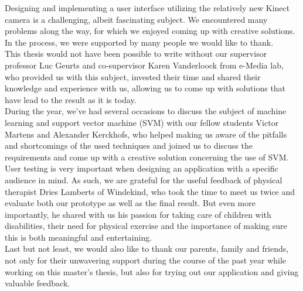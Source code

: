 Designing and implementing a user interface utilizing the relatively new Kinect camera is a challenging, albeit fascinating subject. We encountered many problems along the way, for which we enjoyed coming up with creative solutions. In the process, we were supported by many people we would like to thank.\\

This thesis would not have been possible to write without our supervisor professor Luc Geurts and co-supervisor Karen Vanderloock from e-Media lab, who provided us with this subject, invested their time and shared their knowledge and experience with us, allowing us to come up with solutions that have lead to the result as it is today.\\

During the year, we've had several occasions to discuss the subject of machine learning and support vector machine (SVM) with our fellow students Victor Martens and Alexander Kerckhofs, who helped making us aware of the pitfalls and shortcomings of the used techniques and joined us to discuss the requirements and come up with a creative solution concerning the use of SVM.\\

User testing is very important when designing an application with a specific audience in mind. As such, we are grateful for the useful feedback of physical therapist Dries Lamberts of Windekind, who took the time to meet us twice and evaluate both our prototype as well as the final result. But even more importantly, he shared with us his passion for taking care of children with disabilities, their need for physical exercise and the importance of making sure this is both meaningful and entertaining.\\

Last but not least, we would also like to thank our parents, family and friends, not only for their unwavering support during the course of the past year while working on this master's thesis, but also for trying out our application and giving valuable feedback.